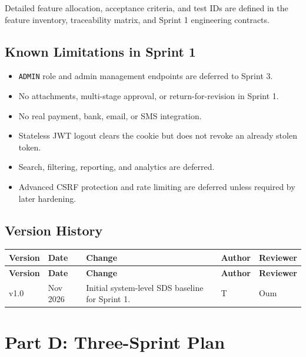 \documentclass[11pt,a4paper]{article}
\begin{document}
Detailed feature allocation, acceptance criteria, and test IDs are defined in the feature inventory, traceability matrix, and Sprint 1 engineering contracts.\\


\subsection{Known Limitations in Sprint 1}

\begin{itemize}[leftmargin=*,itemsep=2pt,topsep=2pt]
  \item \texttt{ADMIN} role and admin management endpoints are deferred to Sprint 3.
  \item No attachments, multi-stage approval, or return-for-revision in Sprint 1.
  \item No real payment, bank, email, or SMS integration.
  \item Stateless JWT logout clears the cookie but does not revoke an already stolen token.
  \item Search, filtering, reporting, and analytics are deferred.
  \item Advanced CSRF protection and rate limiting are deferred unless required by later hardening.
\end{itemize}

\subsection{Version History}

\vspace{0.3em}
\begin{longtable}{|>{\centering\arraybackslash}p{1.2cm}|>{\centering\arraybackslash}p{1.8cm}|>{\RaggedRight}p{6.6cm}|>{\RaggedRight}p{3.2cm}|>{\centering\arraybackslash}p{1.6cm}|}
\hline
\rowcolor{zenPale}\textbf{Version} & \textbf{Date} & \textbf{Change} & \textbf{Author} & \textbf{Reviewer} \\ \hline
\endfirsthead
\hline
\rowcolor{zenPale}\textbf{Version} & \textbf{Date} & \textbf{Change} & \textbf{Author} & \textbf{Reviewer} \\ \hline
\endhead
\hline
\endfoot
v1.0 & 6 Nov 2026 & Initial system-level SDS baseline for Sprint 1. & T & Oum \\ \hline
\end{longtable}
\vspace{0.3em}
\newpage
\section{Part D: Three-Sprint Plan}\label{sec:part-d}
\end{document}
